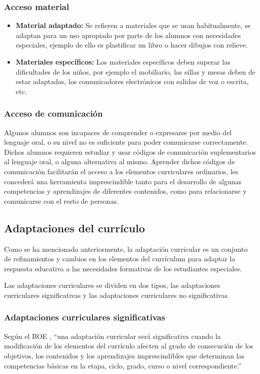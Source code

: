 \subsubsection{Acceso material}
\begin{itemize}
    \item \textbf{Material adaptado:} Se refieren a materiales que se usan habitualmente, se adaptan para un uso apropiado por parte de los alumnos con necesidades especiales, ejemplo de ello es plastificar un libro o hacer dibujos con relieve.
    \item \textbf{Materiales específicos:} Los materiales específicos deben superar las dificultades de los niños, por ejemplo el mobiliario, las sillas y mesas deben de estar adaptadas, los comunicadores electrónicos con salidas de voz o escrita, etc.
\end{itemize}

\subsubsection{Acceso de comunicación}
Algunos alumnos son incapaces de comprender o expresarse por medio del lenguaje oral, o su nivel no es suficiente para poder comunicarse correctamente. Dichos alumnos requieren estudiar y usar códigos de comunicación suplementarios al lenguaje oral, o alguna alternativa al mismo. Aprender dichos códigos de comunicación facilitarán el acceso a los elementos curriculares ordinarios, les concederá una herramienta imprescindible tanto para el desarrollo de algunas competencias y aprendizajes de diferentes contenidos, como para relacionarse y comunicarse con el resto de personas.

\subsection{Adaptaciones del currículo}

Como se ha mencionado anteriormente, la adaptación curricular es un conjunto de refinamientos y cambios en los elementos del currículum para adaptar la respuesta educativa a las necesidades formativas de los estudiantes especiales. 

Las adaptaciones curriculares se dividen en dos tipos, las adaptaciones curriculares significativas y las adaptaciones curriculares no significativas. 
\subsubsection{Adaptaciones curriculares significativas}
Según el BOE \citep[2]{BOE}, ``una adaptación curricular será significativa cuando la modificación de los elementos del currículo afecten al grado de consecución de los objetivos, los contenidos y los aprendizajes imprescindibles que determinan las competencias básicas en la etapa, ciclo, grado, curso o nivel correspondiente.''

